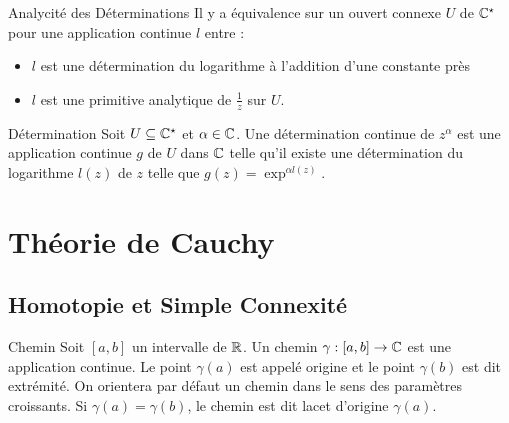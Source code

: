 \documentclass{cours}
\begin{document}
\begin{propositionfr}{Analycité des Déterminations}{}
    Il y a équivalence sur un ouvert connexe $U$ de $\mathbb{C}^{\star}$ pour une application continue $l$ entre : 
    \begin{itemize}
        \item $l$ est une détermination du logarithme à l'addition d'une constante près
        \item $l$ est une primitive analytique de $\frac{1}{z}$ sur $U$. 
    \end{itemize}
\end{propositionfr}

\begin{définition}{Détermination}{}
    Soit $U \subseteq \mathbb{C}^{\star}$ et $\alpha \in \mathbb{C}$. Une détermination continue de $z^{\alpha}$ est une application continue $g$ de $U$ dans $\mathbb{C}$ telle qu'il existe une détermination du logarithme $l(z)$ de $z$ telle que $g(z) = \exp^{\alpha l(z)}$.
\end{définition}

\section{Théorie de Cauchy}
\subsection{Homotopie et Simple Connexité}
\begin{définition}{Chemin}{}
    Soit $\left[a, b\right]$ un intervalle de $\mathbb{R}$. Un chemin $\gamma: \left[a, b\right] \to \mathbb{C}$ est une application continue. Le point $\gamma(a)$ est appelé origine et le point $\gamma(b)$ est dit extrémité. On orientera par défaut un chemin dans le sens des paramètres croissants. Si $\gamma(a) = \gamma(b)$, le chemin est dit lacet d'origine $\gamma(a)$.
\end{définition}
\end{document}
